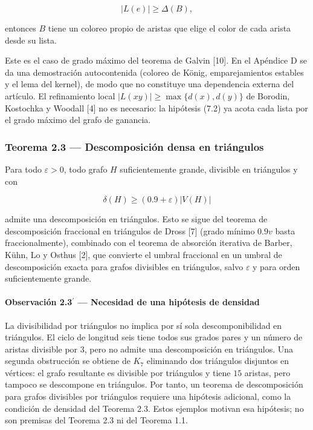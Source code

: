 \documentclass[
  spanish,
  11pt,
  a4paper,
]{article}
\begin{document}
\[
|L(e)|\ge\Delta(B),
\]

entonces \(B\) tiene un coloreo propio de aristas que elige el color de cada arista desde su lista.

Este es el caso de grado máximo del teorema de Galvin {[}10{]}. En el Apéndice D se da una demostración autocontenida (coloreo de König, emparejamientos estables y el lema del kernel), de modo que no constituye una dependencia externa del artículo. El refinamiento local \(|L(xy)|\ge\max\{d(x),d(y)\}\) de Borodin, Kostochka y Woodall {[}4{]} no es necesario: la hipótesis (7.2) ya acota cada lista por el grado máximo del grafo de ganancia.

\subsubsection{Teorema 2.3 --- Descomposición densa en triángulos}\label{teorema-2.3-descomposiciuxf3n-densa-en-triuxe1ngulos}

Para todo \(\varepsilon>0\), todo grafo \(H\) suficientemente grande, divisible en triángulos y con

\[
\delta(H)\ge(0.9+\varepsilon)|V(H)|
\]

admite una descomposición en triángulos. Esto se sigue del teorema de descomposición fraccional en triángulos de Dross {[}7{]} (grado mínimo \(0.9v\) basta fraccionalmente), combinado con el teorema de absorción iterativa de Barber, Kühn, Lo y Osthus {[}2{]}, que convierte el umbral fraccional en un umbral de descomposición exacta para grafos divisibles en triángulos, salvo \(\varepsilon\) y para orden suficientemente grande.

\paragraph{\texorpdfstring{Observación 2.3\(^{\prime}\) --- Necesidad de una hipótesis de densidad}{Observación 2.3\^{}\{\textbackslash prime\} --- Necesidad de una hipótesis de densidad}}\label{observaciuxf3n-2.3prime-necesidad-de-una-hipuxf3tesis-de-densidad}

La divisibilidad por triángulos no implica por sí sola descomponibilidad en triángulos. El ciclo de longitud seis tiene todos sus grados pares y un número de aristas divisible por \(3\), pero no admite una descomposición en triángulos. Una segunda obstrucción se obtiene de \(K_7\) eliminando dos triángulos disjuntos en vértices: el grafo resultante es divisible por triángulos y tiene \(15\) aristas, pero tampoco se descompone en triángulos. Por tanto, un teorema de descomposición para grafos divisibles por triángulos requiere una hipótesis adicional, como la condición de densidad del Teorema 2.3. Estos ejemplos motivan esa hipótesis; no son premisas del Teorema 2.3 ni del Teorema 1.1.
\end{document}
